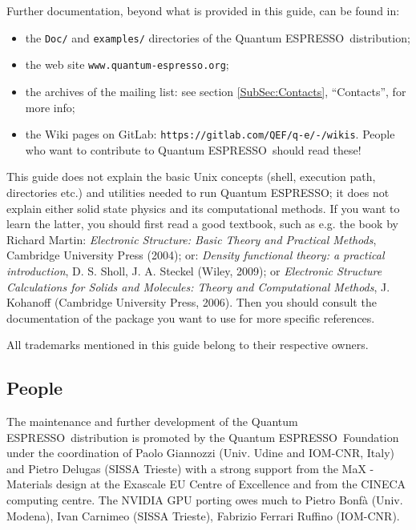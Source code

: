 \documentclass[12pt,a4paper]{article}
\def\qe{{\sc Quantum ESPRESSO}}
\begin{document}
Further documentation, beyond what is provided in this guide, can be found in:
\begin{itemize}
\item the \texttt{Doc/} and \texttt{examples/} directories
   of the \qe\ distribution;
\item the web site \texttt{www.quantum-espresso.org};
\item the archives of the  mailing list:
   see section \ref{SubSec:Contacts}, ``Contacts'', for more info;
\item the Wiki pages on GitLab:
   \texttt{https://gitlab.com/QEF/q-e/-/wikis}.
   People who want to contribute to \qe\ should read these!
\end{itemize}
This guide does not explain the basic Unix concepts (shell, execution
path, directories etc.) and utilities needed to run \qe; it does not
explain either solid state physics and its computational methods.
If you want to learn the latter, you should first read a good textbook,
such as e.g. the book by Richard Martin:
{\em Electronic Structure: Basic Theory and Practical Methods},
Cambridge University Press (2004); or:
{\em Density functional theory: a practical introduction},
D. S. Sholl, J. A. Steckel (Wiley, 2009); or
{\em Electronic Structure Calculations for Solids and Molecules:
Theory and Computational Methods},
J. Kohanoff (Cambridge University Press, 2006). Then you should consult
the documentation of the package you want to use for more specific references.

All trademarks mentioned in this guide belong to their respective owners.

\subsection{People}

The maintenance and further development of the \qe\ distribution
is promoted by the \qe\ Foundation under the coordination of
Paolo Giannozzi (Univ. Udine and IOM-CNR, Italy) and Pietro Delugas
(SISSA Trieste) with a strong support from the MaX - Materials design
at the Exascale EU Centre of Excellence and from the CINECA computing 
centre. The NVIDIA GPU porting owes much to Pietro Bonf\`a (Univ. Modena),
Ivan Carnimeo (SISSA Trieste), Fabrizio Ferrari Ruffino (IOM-CNR).
\end{document}
